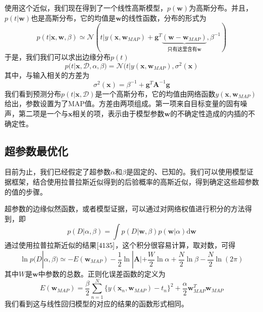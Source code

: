 使用这个近似，我们现在得到了一个线性高斯模型，$p(\boldsymbol{w})$为高斯分布。并且，$p(t|\boldsymbol{w})$也是高斯分布，它的均值是$\boldsymbol{w}$的线性函数，分布的形式为
\begin{equation}
	p(t|\boldsymbol{x},\boldsymbol{w},\beta)\simeq \mathcal{N}(t|y(\boldsymbol{x},\boldsymbol{w}_{MAP})+\boldsymbol{g}^T\underbrace{(\boldsymbol{w}-\boldsymbol{w}_{MAP})}_{\text{只有这里含有$\boldsymbol{w}$}},\beta^{-1} )
\end{equation}
于是，我们我们可以求出边缘分布$p(t)$
\begin{equation}
	p(t|\boldsymbol{x},\mathcal{D},\alpha,\beta)=\mathcal{N}(t|y(\boldsymbol{x},\boldsymbol{w}_{MAP}),\sigma^2(\boldsymbol{x})
\end{equation}
其中，与输入相关的方差为
\begin{equation}
	\sigma^2(\boldsymbol{x})=\beta^{-1}+\boldsymbol{g}^T\boldsymbol{A}^{-1}\boldsymbol{g}
\end{equation}
我们看到预测分布$p(t|\boldsymbol{x},\mathcal{D})$是一个高斯分布，它的均值由网络函数$y(\boldsymbol{x},\boldsymbol{w}_{MAP})$给出，参数设置为了MAP值。方差由两项组成。第一项来自目标变量的固有噪声，第二项是一个与$\boldsymbol{x}$相关的项，表示由于模型参数$\boldsymbol{w}$的不确定性造成的内插的不确定性。
\subsection*{超参数最优化}
目前为止，我们已经假定了超参数$\alpha$和$\beta$是固定的、已知的。我们可以使用模型证据框架，结合使用拉普拉斯近似得到的后验概率的高斯近似，得到确定这些超参数的值的步骤。

超参数的边缘似然函数，或者模型证据，可以通过对网络权值进行积分的方法得到，即
\begin{equation}
	p(D|\alpha,\beta)=\int p(D|\boldsymbol{w},\beta)p(\boldsymbol{w}|\alpha)\mathrm{d}\boldsymbol{w}
\end{equation}
通过使用拉普拉斯近似的结果$\ref{4135}$，这个积分很容易计算，取对数，可得
\begin{equation}
\label{5175}
	\ln p(D|\alpha,\beta)\simeq -E(\boldsymbol{w}_{MAP})-\frac{1}{2}\ln |\boldsymbol{A}|+\frac{W}{2}\ln \alpha +\frac{N}{2}\ln \beta -\frac{N}{2}\ln (2\pi)
\end{equation}
其中$W$是$\boldsymbol{w}$中参数的总数。正则化误差函数的定义为
\begin{equation}
	E(\boldsymbol{w}_{MAP})=\frac{\beta}{2}\sum_{n=1}^{N}\{y(\boldsymbol{x}_n,\boldsymbol{w}_{MAP})-t_n \}^2 +\frac{\alpha}{2}\boldsymbol{w}_{MAP}^T\boldsymbol{w}_{MAP}
\end{equation}
我们看到这与线性回归模型的对应的结果的函数形式相同。

